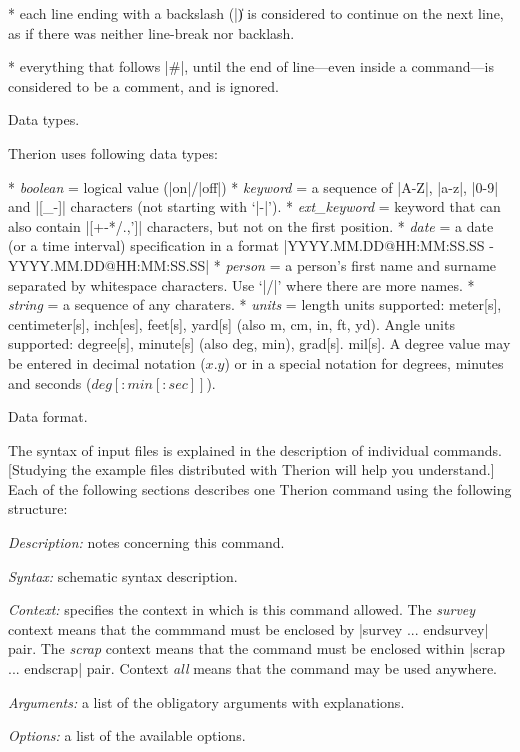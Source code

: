 * each line ending with a backslash (|\|) is considered to continue on 
  the next line, as if there was neither line-break nor backlash.

* everything that follows |#|, until the end of line---even inside a command---is 
  considered to be a comment, and is ignored.
\endlist


\subchapter Data types.

Therion uses following data types:

\list
* {\it boolean} = logical value (|on|/|off|)
* {\it keyword} = a sequence of |A-Z|, |a-z|, |0-9| and |[_-]| characters 
             (not starting with `|-|').
* {\it ext\_keyword} = keyword that can also contain |[+-*/.,']| characters, but not
                 on the first position.
* {\it date} = a date (or a time interval) specification in a format\hfil\break
          |YYYY.MM.DD@HH:MM:SS.SS - YYYY.MM.DD@HH:MM:SS.SS|
* {\it person} = a person's first name and surname separated by whitespace characters.
            Use `|/|' where there are more names.
* {\it string} = a sequence of any charaters.
* {\it units} = length units supported: 
           meter[s], centimeter[s], inch[es], feet[s], yard[s]
           (also m, cm, in, ft, yd).
           Angle units supported: degree[s], minute[s] (also deg, min), 
	   grad[s]. mil[s]. A degree value may be entered in decimal notation
	   ($x.y$) or in a special notation for degrees, minutes and seconds
	   ($deg[{:}min[{:}sec]]$).
\endlist


\subchapter Data format.

The syntax of input files is explained in the description of
individual commands. [Studying the example files distributed with
Therion will help you understand.]  Each of the following sections describes
one Therion command using the following structure:

{\it Description:} notes concerning this command.

{\it Syntax:} schematic syntax description. 

{\it Context:} specifies the context in which is this command allowed. 
The {\it survey} context means that the commmand must be enclosed by 
|survey ... endsurvey| pair. The {\it scrap} context means that the command must be 
enclosed within |scrap ... endscrap| pair. Context {\it all} means that 
the command may be used anywhere.

{\it Arguments:} a list of the obligatory arguments with explanations.

{\it Options:} a list of the available options.

